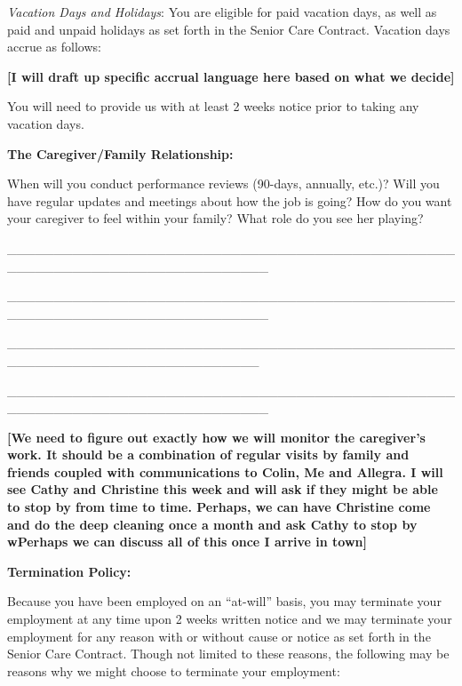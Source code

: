 \documentclass[]{article}
\begin{document}
\emph{Vacation Days and Holidays}: You are eligible for paid vacation
days, as well as paid and unpaid holidays as set forth in the Senior
Care Contract. Vacation days accrue as follows:

\textbf{{[}I will draft up specific accrual language here based on what
we decide{]}}

You will need to provide us with at least 2 weeks notice prior to taking
any vacation days.

\textbf{The Caregiver/Family Relationship:}

When will you conduct performance reviews (90-days, annually, etc.)?
Will you have regular updates and meetings about how the job is going?
How do you want your caregiver to feel within your family? What role do
you see her playing?

\_\_\_\_\_\_\_\_\_\_\_\_\_\_\_\_\_\_\_\_\_\_\_\_\_\_\_\_\_\_\_\_\_\_\_\_\_\_\_\_\_\_\_\_\_\_\_\_\_\_\_\_\_\_\_\_\_\_\_\_\_\_\_\_\_\_\_\_\_\_\_\_\_\_\_\_

\_\_\_\_\_\_\_\_\_\_\_\_\_\_\_\_\_\_\_\_\_\_\_\_\_\_\_\_\_\_\_\_\_\_\_\_\_\_\_\_\_\_\_\_\_\_\_\_\_\_\_\_\_\_\_\_\_\_\_\_\_\_\_\_\_\_\_\_\_\_\_\_\_\_\_\_

\_\_\_\_\_\_\_\_\_\_\_\_\_\_\_\_\_\_\_\_\_\_\_\_\_\_\_\_\_\_\_\_\_\_\_\_\_\_\_\_\_\_\_\_\_\_\_\_\_\_\_\_\_\_\_\_\_\_\_\_\_\_\_\_\_\_\_\_\_\_\_\_\_\_\_

\_\_\_\_\_\_\_\_\_\_\_\_\_\_\_\_\_\_\_\_\_\_\_\_\_\_\_\_\_\_\_\_\_\_\_\_\_\_\_\_\_\_\_\_\_\_\_\_\_\_\_\_\_\_\_\_\_\_\_\_\_\_\_\_\_\_\_\_\_\_\_\_\_\_\_\_

\textbf{{[}We need to figure out exactly how we will monitor the
caregiver's work. It should be a combination of regular visits by family
and friends coupled with communications to Colin, Me and Allegra. I will
see Cathy and Christine this week and will ask if they might be able to
stop by from time to time. Perhaps, we can have Christine come and do
the deep cleaning once a month and ask Cathy to stop by wPerhaps we can
discuss all of this once I arrive in town{]}}

\textbf{Termination Policy:}

Because you have been employed on an ``at-will'' basis, you may
terminate your employment at any time upon 2 weeks written notice and we
may terminate your employment for any reason with or without cause or
notice as set forth in the Senior Care Contract. Though not limited to
these reasons, the following may be reasons why we might choose to
terminate your employment:
\end{document}
